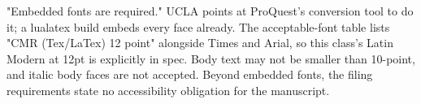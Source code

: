 %
%


%


	{"Embedded fonts are required." UCLA points at ProQuest's conversion tool
	 to do it; a lualatex build embeds every face already.}
	{The acceptable-font table lists "CMR (Tex/LaTex) 12 point" alongside Times
	 and Arial, so this class's Latin Modern at 12pt is explicitly in spec.
	 Body text may not be smaller than 10-point, and italic body faces are not
	 accepted.}
	{Beyond embedded fonts, the filing requirements state no accessibility
	 obligation for the manuscript.}
